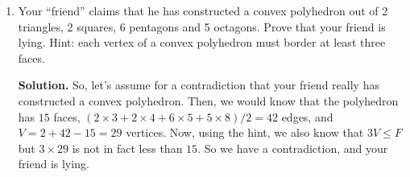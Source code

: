 \documentclass{book}
\begin{document}
\begin{activity}[]
\begin{enumerate}[font=\bfseries,label=(\alph*),ref=\alph*]
\item\label{task-45} \hypertarget{p-330}{}%
Your ``friend'' claims that he has constructed a convex polyhedron out of 2 triangles, 2 squares, 6 pentagons and 5 octagons. Prove that your friend is lying. Hint: each vertex of a convex polyhedron must border at least three faces.%
\par\smallskip%
\noindent\textbf{Solution.}\hypertarget{solution-28}{}\quad%
\hypertarget{p-331}{}%
So, let's assume for a contradiction that your friend really has constructed a convex polyhedron. Then, we would know that the polyhedron has \(15\) faces, \((2\times 3+2\times 4+6\times 5+5\times 8)/2 = 42\) edges, and \(V=2+42-15=29\) vertices. Now, using the hint, we also know that \(3V\leq F\) but \(3\times 29\) is not in fact less than \(15\). So we have a contradiction, and your friend is lying.%
\end{enumerate}
\end{activity}

\clearpage
\end{document}
